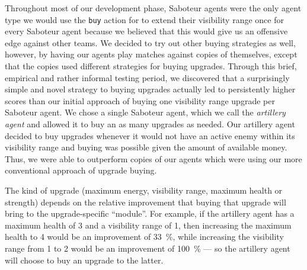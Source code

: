 \begin{description}
        Throughout most of our development phase, Saboteur agents were the only agent type we would use the \texttt{buy} action for to extend their visibility range once for every Saboteur agent because we believed that this would give us an offensive edge against other teams.
        We decided to try out other buying strategies as well, however, by having our agents play matches against copies of themselves, except that the copies used different strategies for buying upgrades.
        Through this brief, empirical and rather informal testing period, we discovered that a surprisingly simple and novel strategy to buying upgrades actually led to persistently higher scores than our initial approach of buying one visibility range upgrade per Saboteur agent.
        We chose a single Saboteur agent, which we call the \emph{artillery agent} and allowed it to buy an as many upgrades as needed.
        Our artillery agent decided to buy upgrades whenever it would not have an active enemy within its visibility range and buying was possible given the amount of available money.
        Thus, we were able to outperform copies of our agents which were using our more conventional approach of upgrade buying.

        The kind of upgrade (maximum energy, visibility range, maximum health or strength) depends on the relative improvement that buying that upgrade will bring to the upgrade-specific \enquote{module}.
        For example, if the artillery agent has a maximum health of 3 and a visibility range of 1, then increasing the maximum health to 4 would be an improvement of \SI{33}{\percent}, while increasing the visibility range from 1 to 2 would be an improvement of \SI{100}{\percent} --- so the artillery agent will choose to buy an upgrade to the latter.


\end{description}
